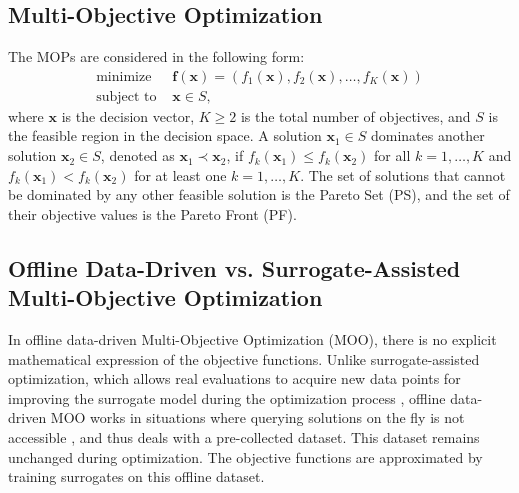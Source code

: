 \documentclass{article}
\begin{document}
\subsection{Multi-Objective Optimization}
The MOPs are considered in the following form:
\begin{align}\label{eq:mops}
\text{minimize }& \boldsymbol{f}(\boldsymbol{x}) = \left(f_1(\boldsymbol{x}), f_2(\boldsymbol{x}), \ldots, f_K(\boldsymbol{x})\right) \nonumber \\
\text{subject to }& \boldsymbol{x} \in S,
\end{align}
where $\boldsymbol{x}$ is the decision vector, $K \geq 2$ is the total number of objectives, and $S$ is the feasible region in the decision space. A solution $\boldsymbol{x}_{1} \in S$ dominates another solution $\boldsymbol{x}_{2} \in S$, denoted as $\boldsymbol{x}_{1} \prec \boldsymbol{x}_{2}$, if $f_k(\boldsymbol{x}_{1}) \leq f_k(\boldsymbol{x}_{2})$ for all $k = 1,\ldots,K$ and $f_k(\boldsymbol{x}_{1}) < f_k(\boldsymbol{x}_{2})$ for at least one $k = 1,\ldots,K$. The set of solutions that cannot be dominated by any other feasible solution is the Pareto Set (PS), and the set of their objective values is the Pareto Front (PF).

\subsection{Offline Data-Driven vs. Surrogate-Assisted Multi-Objective Optimization}
In offline data-driven Multi-Objective Optimization (MOO), there is no explicit mathematical expression of the objective functions. Unlike surrogate-assisted optimization, which allows real evaluations to acquire new data points for improving the surrogate model during the optimization process \cite{kriging_assisted}, offline data-driven MOO works in situations where querying solutions on the fly is not accessible \cite{ddeo_ibea,ddeo_rvea}, and thus deals with a pre-collected dataset. This dataset remains unchanged during optimization. The objective functions are approximated by training surrogates on this offline dataset. %
\end{document}
